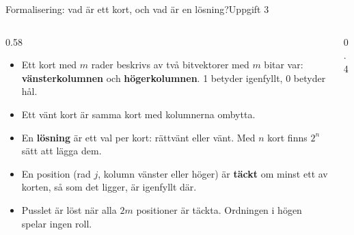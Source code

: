 \documentclass[aspectratio=169,10pt]{beamer}
\newcommand{\hkort}[7][]{%
  \begin{scope}[shift={(#2,#3)},#1]
    \foreach \b [count=\j] in {#4} {\xdef\kortm{\j}}%
    \pgfmathsetmacro{\kH}{0.62+\kortm*0.36+0.34}%
    \path[#7] (0,0) -- (0.52,0) -- (0.52,0.13) -- (0.78,0.13) -- (0.78,0) -- (1.3,0)
      -- (1.3,\kH-0.50) -- (1.17,\kH-0.50) -- (1.17,\kH-0.32) -- (1.3,\kH-0.32) -- (1.3,\kH)
      -- (0,\kH) -- (0,\kH-0.32) -- (0.13,\kH-0.32) -- (0.13,\kH-0.50) -- (0,\kH-0.50) -- cycle;
    \node[font=\scriptsize,inner sep=0pt] at (0.65,\kH-0.25) {#6};
    \foreach \b [count=\j] in {#4} {
      \ifnum\b=1 \path[fill=#7m] (0.38,\kH-0.44-\j*0.36) circle (0.105);
      \else \path[korthal] (0.38,\kH-0.44-\j*0.36) circle (0.105); \fi}
    \foreach \b [count=\j] in {#5} {
      \ifnum\b=1 \path[fill=#7m] (0.92,\kH-0.44-\j*0.36) circle (0.105);
      \else \path[korthal] (0.92,\kH-0.44-\j*0.36) circle (0.105); \fi}
  \end{scope}}
\newcommand{\spegel}[1]{\scalebox{-1}[1]{#1}}
\begin{document}
\begin{frame}{Formalisering: vad är ett kort, och vad är en lösning?}{Uppgift 3}
  \begin{columns}[T]
    \begin{column}{0.58\textwidth}
      \begin{itemize}
        \item<1-> Ett kort med $m$ rader beskrivs av två bitvektorer med $m$ bitar var: \textbf{vänsterkolumnen} och \textbf{högerkolumnen}. 1 betyder igenfyllt, 0 betyder hål.
        \item<2-> Ett vänt kort är samma kort med kolumnerna ombytta.
        \item<3-> En \textbf{lösning} är ett val per kort: rättvänt eller vänt. Med $n$ kort finns $2^n$ sätt att lägga dem.
        \item<4-> En position (rad $j$, kolumn vänster eller höger) är \textbf{täckt} om minst ett av korten, så som det ligger, är igenfyllt där.
        \item<5-> Pusslet är löst när alla $2m$ positioner är täckta. Ordningen i högen spelar ingen roll.
      \end{itemize}
    \end{column}
    \begin{column}{0.4\textwidth}
      \centering
    \end{column}
  \end{columns}
\end{frame}
\end{document}
